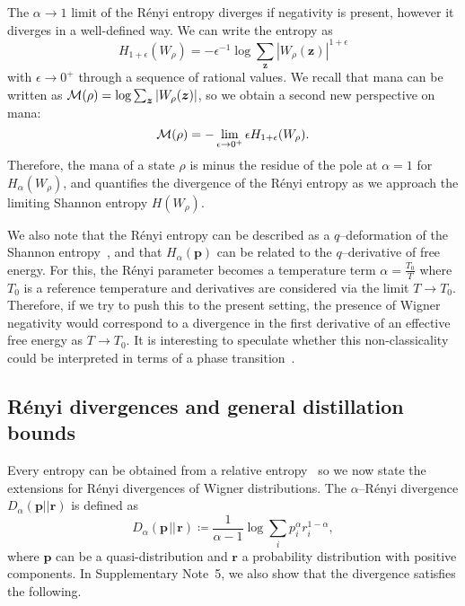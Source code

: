 \documentclass[
onecolumn,
superscriptaddress
]{revtex4-1}
\def\z{\boldsymbol{z}}
\def\r{\boldsymbol{r}}
\def\p{\boldsymbol{p}}
\def\M{{\cal M}}
\begin{document}
The $\alpha \rightarrow 1$ limit of the R\'{e}nyi entropy diverges if negativity is present, however it diverges in a well-defined way. We can write the entropy as 
\begin{equation}
	H_{1+\epsilon}(W_\rho) = -\epsilon^{-1} \log \sum_{\z} |W_\rho (\z)|^{1+\epsilon}
\end{equation} 
with $\epsilon \rightarrow 0^+$ through a sequence of rational values. We recall that mana can be written as $\M(\rho) = \log \sum_{\z} |W_\rho(\z)|$, so we obtain a second new perspective on mana:
\begin{equation}\label{eq:mana-divergence}
	\M(\rho) = -\lim_{\epsilon \rightarrow 0^+} \epsilon H_{1+\epsilon}(W_\rho).
\end{equation}
Therefore, the mana of a state $\rho$ is minus the residue of the pole at $\alpha=1$ for $H_\alpha(W_\rho)$, and quantifies the divergence of the R\'{e}nyi entropy as we approach the limiting Shannon entropy $H(W_\rho)$. 

We also note that the R\'{e}nyi entropy can be described as a $q$--deformation of the Shannon entropy~\cite{baez2011renyi}, and that $H_\alpha(\p)$ can be related to the $q$--derivative of free energy.  For this, the R\'{e}nyi parameter becomes a temperature term $\alpha = \frac{T_0}{T}$ where $T_0$ is a reference temperature and derivatives are considered via the limit $T \rightarrow T_0$. Therefore, if we try to push this to the present setting, the presence of Wigner negativity would correspond to a divergence in the first derivative of an effective free energy as $T \rightarrow T_0$. It is interesting to speculate whether this non-classicality could be interpreted in terms of a phase transition~\cite{domb2000phase}.

\subsection*{R\'{e}nyi divergences and general distillation bounds}
Every entropy can be obtained from a relative entropy~\cite{Gour_2020} so we now state the extensions for R\'{e}nyi divergences of Wigner distributions.
The $\alpha$--R\'{e}nyi divergence $D_\alpha(\p||\r)$ is defined as
\begin{equation}\label{eq:D}
	D_\alpha(\p \hspace{1pt}||\hspace{1pt} \r) \coloneqq \frac{1}{\alpha-1} \log \sum_i p_i^\alpha r_i^{1-\alpha},
\end{equation}
where $\p$ can be a quasi-distribution and $\r$ a probability distribution with positive components. In Supplementary Note~5, we also show that the divergence satisfies the following.
\end{document}
